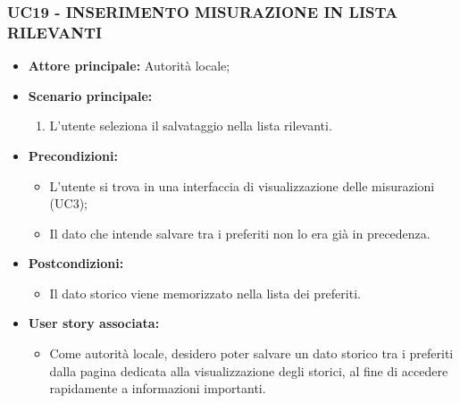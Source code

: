 \subsubsection{UC19 - INSERIMENTO MISURAZIONE IN LISTA RILEVANTI}
\begin{itemize}
    \item \textbf{Attore principale:} Autorità locale;
    \item \textbf{Scenario principale:}
          \begin{enumerate}
              \item L'utente seleziona il salvataggio nella lista rilevanti.
          \end{enumerate}
    \item \textbf{Precondizioni:}
          \begin{itemize}
            \item  L'utente si trova in una interfaccia di visualizzazione delle misurazioni (UC3);
            \item  Il dato che intende salvare tra i preferiti non lo era già in precedenza.
          \end{itemize}
    \item \textbf{Postcondizioni:}
          \begin{itemize}
              \item  Il dato storico viene memorizzato nella lista dei preferiti.
          \end{itemize}
    \item \textbf{User story associata:}
          \begin{itemize}
              \item Come autorità locale, desidero poter salvare un dato storico tra i preferiti dalla pagina dedicata alla visualizzazione degli storici, al fine di accedere rapidamente a informazioni importanti.
          \end{itemize}
\end{itemize}